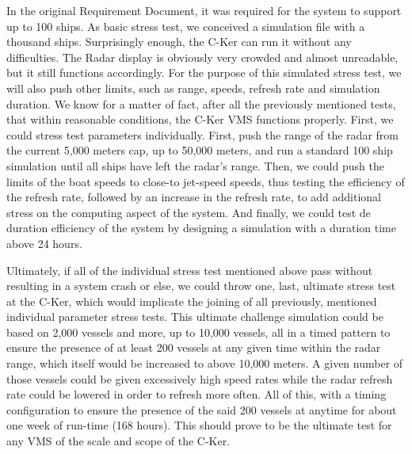 \documentclass[12pt]{article}
\begin{document}
In the original Requirement Document, it was required for the system to support up to 100 ships. As basic stress test, we conceived a simulation file with a thousand ships. Surprisingly enough, the C-Ker can run it without any difficulties. The Radar display is obviously very crowded and almost unreadable, but it still functions accordingly. For the purpose of this simulated stress test, we will also push other limits, such as range, speeds, refresh rate and simulation duration. We know for a matter of fact, after all the previously mentioned tests, that within reasonable conditions, the C-Ker VMS functions properly. First, we could stress test parameters individually. First, push the range of the radar from the current 5,000 meters cap, up to 50,000 meters, and run a standard 100 ship simulation until all ships have left the radar’s range. Then, we could push the limits of the boat speeds to close-to jet-speed speeds, thus testing the efficiency of the refresh rate, followed by an increase in the refresh rate, to add additional stress on the computing aspect of the system. And finally, we could test de duration efficiency of the system by designing a simulation with a duration time above 24 hours.\par
Ultimately, if all of the individual stress test mentioned above pass without resulting in a system crash or else, we could throw one, last, ultimate stress test at the C-Ker, which would implicate the joining of all previously, mentioned individual parameter stress tests. This ultimate challenge simulation could be based on 2,000 vessels and more, up to 10,000 vessels, all in a timed pattern to ensure the presence of at least 200 vessels at any given time within the radar range, which itself would be increased to above 10,000 meters. A given number of those vessels could be given excessively high speed rates while the radar refresh rate could be lowered in order to refresh more often. All of this, with a timing configuration to ensure the presence of the said 200 vessels at anytime for about one week of run-time (168 hours). This should prove to be the ultimate test for any VMS of the scale and scope of the C-Ker.











\end{document}
